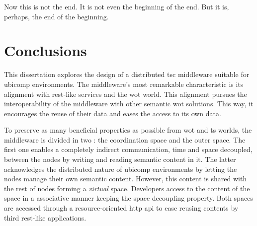 
\begin{savequote}[50mm]
Now this is not the end.
It is not even the beginning of the end.
But it is, perhaps, the end of the beginning.
\end{savequote}


\chapter{Conclusions}
\label{cha:conclusions}
\newcommand{\pathchapsix}{6_conclusion}


\ifpdf
    \graphicspath{{\pathchapsix/figures/PNG/}{\pathchapsix/figures/PDF/}{\pathchapsix/figures/}}
\else
    \graphicspath{{\pathchapsix/figures/EPS/}{\pathchapsix/figures/}}
\fi




This dissertation explores the design of a distributed \ac{tsc} middleware suitable for \ac{ubicomp} environments.
The middleware's most remarkable characteristic is its alignment with \ac{rest}-like services and the \ac{wot} world.
This alignment pursues the interoperability of the middleware with other semantic \ac{wot} solutions.
This way, it encourages the reuse of their data and eases the access to its own data.


To preserve as many beneficial properties as possible from \ac{wot} and \ac{ts} worlds, the middleware is divided in two \Spaces{}: the coordination space and the outer space. %
The first one enables a completely indirect communication, time and space decoupled, between the nodes by writing and reading semantic content in it.
The latter acknowledges the distributed nature of \ac{ubicomp} environments by letting the nodes manage their own semantic content.
However, this content is shared with the rest of nodes forming a \emph{virtual} space.
Developers access to the content of the space in a associative manner keeping the space decoupling property.
Both spaces are accessed through a resource-oriented \ac{http} \ac{api} to ease reusing contents by third \ac{rest}-like applications. %


